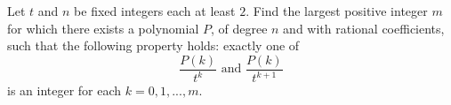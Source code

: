 Let $t$ and $n$ be fixed integers each at least $2$. Find the largest positive integer $m$ for which there exists a polynomial $P$, of degree $n$ and with rational coefficients, such that the following property holds: exactly one of \[ \frac{P(k)}{t^k} \text{ and } \frac{P(k)}{t^{k+1}} \] is an integer for each $k = 0,1, ..., m$.

